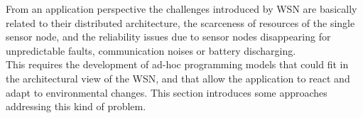 
From an application perspective the challenges introduced by WSN are basically
related to their distributed architecture, the scarceness of resources of the single
sensor node, and the reliability issues due to sensor nodes disappearing for
unpredictable faults, communication noises or battery discharging.
\\
This requires the development of ad-hoc programming models that could fit in the
architectural view of the WSN, and that allow the application to react and adapt
to environmental changes.
This section introduces some approaches addressing this kind of problem.




